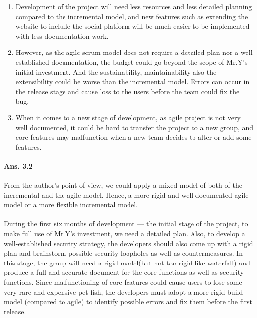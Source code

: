 \documentclass[paper=a4, fontsize=11pt]{scrartcl} %
\numberwithin{equation}{section} %
\numberwithin{figure}{section} %
\numberwithin{table}{section} %
\begin{document}
\begin{itemize}
\begin{enumerate}
		\item Development of the project will need less resources and less detailed planning compared to the incremental model, and new features such as extending the website to include the social platform will be much easier to be implemented with less documentation work.
		\item However, as the agile-scrum model does not require a detailed plan nor a well established documentation, the budget could go beyond the scope of Mr.Y's initial investment. And the sustainability, maintainability also the extensibility\cite{agilemodel} could be worse than the incremental model. Errors can occur in the release stage and cause loss to the users before the team could fix the bug.
		\item When it comes to a new stage of development, as agile project is not very well documented, it could be hard to transfer the project to a new group, and core features may malfunction when a new team decides to alter or add some features.
	\end{enumerate}
\end{itemize}
\paragraph{Ans. 3.2}From the author's point of view, we could apply a mixed model of both of the incremental and the agile model. Hence, a more rigid and well-documented agile model or a more flexible incremental model.

\paragraph{} During the first six months of development --- the initial stage of the project, to make full use of Mr.Y's investment, we need a detailed plan. Also, to develop a well-established security strategy, the developers should also come up with a rigid plan and brainstorm possible security loopholes as well as countermeasures. In this stage, the group will need a rigid model(but not too rigid like waterfall) and produce a full and accurate document for the core functions as well as security functions. Since malfunctioning of core features could cause users to lose some very rare and expensive pet fish, the developers must adopt a more rigid build model (compared to agile) to identify possible errors and fix them before the first release.
\end{document}
